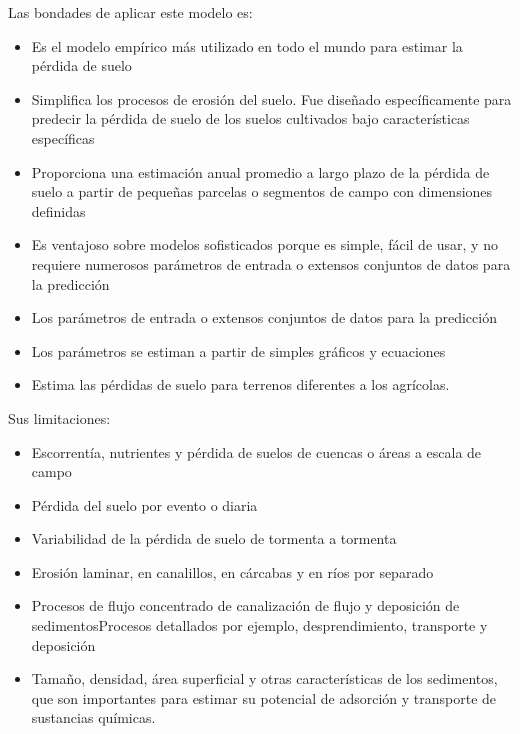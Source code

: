     Las bondades de aplicar este modelo es:
    \begin{itemize}
        \item Es el modelo empírico más utilizado en todo el mundo para estimar la pérdida de suelo
        \item Simplifica los procesos de erosión del suelo. Fue diseñado específicamente para predecir la pérdida de suelo de los suelos cultivados bajo características específicas
        \item Proporciona una estimación anual promedio a largo plazo de la pérdida de suelo a partir de pequeñas parcelas o segmentos de campo con dimensiones definidas
        \item Es ventajoso sobre modelos sofisticados porque es simple, fácil de usar, y no requiere numerosos parámetros de entrada o extensos conjuntos de datos para la predicción
        \item Los parámetros de entrada o extensos conjuntos de datos para la predicción
        \item Los parámetros se estiman a partir de simples gráficos y ecuaciones
        \item Estima las pérdidas de suelo para terrenos diferentes a los agrícolas.
    \end{itemize}
    Sus limitaciones:
    \begin{itemize}
        \item Escorrentía, nutrientes y pérdida de suelos de cuencas o áreas a escala de campo
        \item Pérdida del suelo por evento o diaria
        \item Variabilidad de la pérdida de suelo de tormenta a tormenta
        \item Erosión laminar, en canalillos, en cárcabas y en ríos por separado
        \item Procesos de flujo concentrado de canalización de flujo y deposición de sedimentosProcesos detallados por ejemplo, desprendimiento, transporte y deposición
        \item Tamaño, densidad, área superficial y otras características de los sedimentos, que son importantes para estimar su potencial de adsorción y transporte de sustancias químicas.
    \end{itemize}
    
